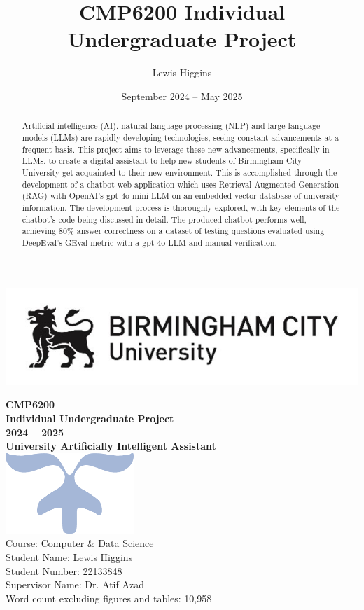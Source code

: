 \documentclass[12pt]{report}
\title{CMP6200 Individual Undergraduate Project}
\author{Lewis Higgins}
\date{September 2024 – May 2025}
\begin{document}
\makeatletter
\begin{titlepage}
    \includegraphics[width=0.3\linewidth]{BCUWide.jpg}\\[4ex]
    \vspace{1cm}
    \begin{center}
        {\huge \bfseries  CMP6200}\\[2ex]
        {\huge \bfseries  Individual Undergraduate Project}\\[2ex]
        {\huge \bfseries 2024 – 2025}\\[16ex]
        {\huge \bfseries University Artificially Intelligent Assistant}\\[6ex]
        \includegraphics[width=0.1\linewidth]{Symbol.png}\\[40ex]
        Course: Computer \& Data Science\\
        Student Name: Lewis Higgins\\
        Student Number: 22133848\\
        Supervisor Name: Dr. Atif Azad\\
        Word count excluding figures and tables: 10,958
    \end{center}
\end{titlepage}
\makeatother
\thispagestyle{empty}
\newpage

\begin{abstract}
    Artificial intelligence (AI), natural language processing (NLP) and large language models (LLMs) are
    rapidly developing technologies, seeing constant advancements at a frequent basis.
    This project aims to leverage these new advancements, specifically in LLMs, to create a digital assistant 
    to help new students of Birmingham City University get acquainted to their new environment. This is accomplished 
    through the development of a chatbot web application which uses Retrieval-Augmented Generation (RAG) with 
    OpenAI's gpt-4o-mini LLM on an embedded vector database of university information. The development process 
    is thoroughly explored, with key elements of the chatbot's code being discussed in detail.
    The produced chatbot performs well, achieving 80\% answer correctness on a dataset of testing questions
    evaluated using DeepEval's GEval metric with a gpt-4o LLM and manual verification.
\end{abstract}
\end{document}
